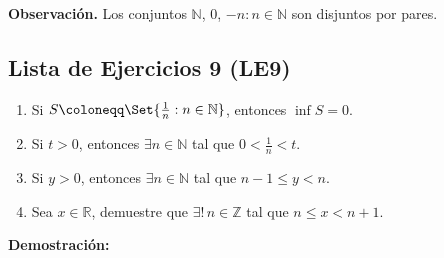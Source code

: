 \documentclass[11pt]{article}
\newcommand{\N}{\mathbb{N}}
\newcommand{\Z}{\mathbb{Z}}
\newcommand{\R}{\mathbb{R}}
\let\set\Set
\begin{document}
\textbf{Observación.} Los conjuntos $\N$, ${0}$, ${-n: n\in \N}$ son disjuntos por pares.

\subsection*{Lista de Ejercicios 9 (LE9)}

\begin{enumerate}[label=\alph*)]
    \item Si $S \coloneqq \set{\frac{1}{n}: n\in \N}$, entonces $\inf{S=0}$.
    \item Si $t>0$, entonces $\exists n\in \N$ tal que $0<\frac{1}{n}<t$.
    \item Si $y>0$, entonces $\exists n\in \N$ tal que $n-1\leq y< n$.
    \item Sea $x\in \R$, demuestre que $\exists! \, n\in \Z$ tal que $n\leq x<n+1$.
\end{enumerate}

\textbf{Demostración:}
\end{document}
